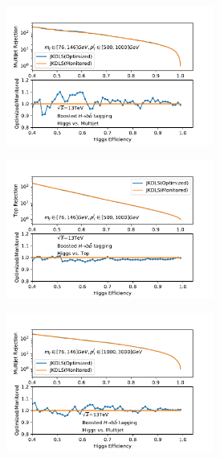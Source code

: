 \begin{figure}[htbp]
\begin{subfigure}{.5\textwidth}
    \caption{}
  \end{subfigure}
 \newline 
   \begin{subfigure}{.5\textwidth}
  \centering
   \includegraphics[width=0.75\textwidth]{figuresXbb/OPT/OPTQCDMASSPT2.pdf}
    \caption{}
  \end{subfigure}
  \begin{subfigure}{.5\textwidth}
  \centering
   \includegraphics[width=0.75\textwidth]{figuresXbb/OPT/OPTopMASSPT2.pdf}
    \caption{}
  \end{subfigure}
 \newline 
   \begin{subfigure}{.5\textwidth}
  \centering
   \includegraphics[width=0.75\textwidth]{figuresXbb/OPT/OPTQCDMASSPT3.pdf}

\end{subfigure}
\end{figure}
